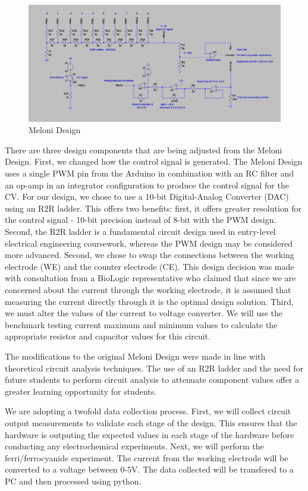 \documentclass{article}
\begin{document}
\begin{figure}[H]
    \centering
    \includegraphics[width=.7\linewidth]{pot_design.png}
    \caption{Meloni Design}
\end{figure}

There are three design components that are being adjusted from the Meloni Design. First, we changed how the control signal is generated. The Meloni Design uses a single PWM pin from the Arduino in combination with an RC filter and an op-amp in an integrator configuration to produce the control signal for the CV. For our design, we chose to use a 10-bit Digital-Analog Converter (DAC) using an R2R ladder. This offers two benefits: first, it offers greater resolution for the control signal - 10-bit precision instead of 8-bit with the PWM design. Second, the R2R ladder is a fundamental circuit design used in entry-level electrical engineering coursework, whereas the PWM design may be considered more advanced. Second, we chose to swap the connections between the working electrode (WE) and the counter electrode (CE). This design decision was made with consultation from a BioLogic representative who claimed that since we are concerned about the current through the working electrode, it is assumed that measuring the current directly through it is the optimal design solution. Third, we must alter the values of the current to voltage converter. We will use the benchmark testing current maximum and minimum values to calculate the appropriate resistor and capacitor values for this circuit.

The modifications to the original Meloni Design were made in line with theoretical circuit analysis techniques. The use of an R2R ladder and the need for future students to perform circuit analysis to attenuate component values offer a greater learning opportunity for students.

We are adopting a twofold data collection process. First, we will collect circuit output measurements to validate each stage of the design. This ensures that the hardware is outputing the expected values in each stage of the hardware before conducting any electrochemical experiments. Next, we will perform the ferri/ferrocyanide experiment. The current from the working electrode will be converted to a voltage between 0-5V. The data collected will be transfered to a PC and then processed using python.
\end{document}
